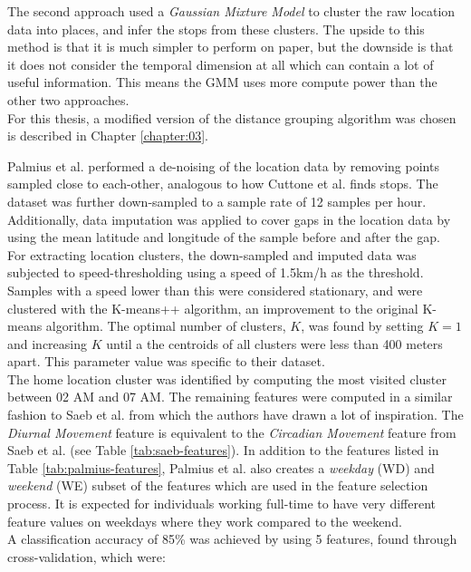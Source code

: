 The second approach used a \textit{Gaussian Mixture Model} to cluster the raw location data into places, and infer the stops from these clusters. The upside to this method is that it is much simpler to perform on paper, but the downside is that it does not consider the temporal dimension at all which can contain a lot of useful information. This means the GMM uses more compute power than the other two approaches. \\

For this thesis, a modified version of the distance grouping algorithm was chosen is described in Chapter \ref{chapter:03}.

Palmius et al. performed a de-noising of the location data by removing points sampled close to each-other, analogous to how Cuttone et al. finds stops. The dataset was further down-sampled to a sample rate of 12 samples per hour. Additionally, data imputation was applied to cover gaps in the location data by using the mean latitude and longitude of the sample before and after the gap. \\

For extracting location clusters, the down-sampled and imputed data was subjected to speed-thresholding using a speed of 1.5km/h as the threshold. Samples with a speed lower than this were considered stationary, and were clustered with the K-means++ algorithm, an improvement to the original K-means algorithm. The optimal number of clusters, $K$, was found by setting $K=1$ and increasing $K$ until a the centroids of all clusters were less than 400 meters apart. This parameter value was specific to their dataset.\\

The home location cluster was identified by computing the most visited cluster between 02 AM and 07 AM. The remaining features were computed in a similar fashion to Saeb et al. from which the authors have drawn a lot of inspiration. The \textit{Diurnal Movement} feature is equivalent to the \textit{Circadian Movement }feature from Saeb et al. (see Table \ref{tab:saeb-features}). In addition to the features listed in Table \ref{tab:palmius-features}, Palmius et al. also creates a \textit{weekday} (WD) and \textit{weekend} (WE) subset of the features which are used in the feature selection process. It is expected for individuals working full-time to have very different feature values on weekdays where they work compared to the weekend.\\

A classification accuracy of 85\% was achieved by using 5 features, found through cross-validation, which were:

